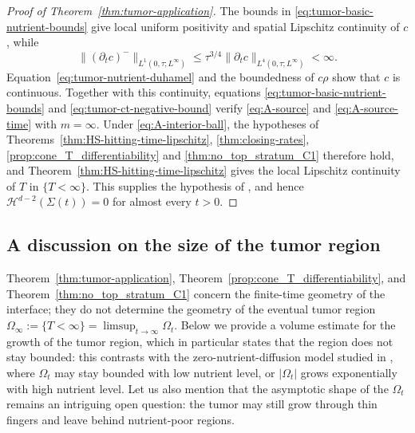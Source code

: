 \documentclass[11pt]{amsart}
\numberwithin{equation}{section}
\numberwithin{figure}{section}
\theoremstyle{plain}
\theoremstyle{definition}
\theoremstyle{remark}
\theoremstyle{plain}
\begin{document}
\begin{proof}[Proof of Theorem~\ref{thm:tumor-application}]
The bounds in \eqref{eq:tumor-basic-nutrient-bounds} give local uniform
positivity and spatial Lipschitz continuity of $c$, while
\begin{equation}\label{eq:tumor-ct-negative-bound}
 \|(\partial_t c)^-\|_{L^1(0,\tau;L^\infty)}
 \leq \tau^{3/4}\|\partial_t c\|_{L^4(0,\tau;L^\infty)}<\infty.
\end{equation}
Equation~\eqref{eq:tumor-nutrient-duhamel} and the boundedness of $c\rho$
show that $c$ is continuous.  Together with this continuity, equations
\eqref{eq:tumor-basic-nutrient-bounds} and
\eqref{eq:tumor-ct-negative-bound} verify \eqref{eq:A-source} and
\eqref{eq:A-source-time} with $m=\infty$. Under \eqref{eq:A-interior-ball}, the hypotheses
of Theorems~\ref{thm:HS-hitting-time-lipschitz}, \ref{thm:closing-rates},
\ref{prop:cone_T_differentiability} and \ref{thm:no_top_stratum_C1} therefore hold, and
Theorem~\ref{thm:HS-hitting-time-lipschitz} gives the local Lipschitz continuity of $T$ in
$\{T<\infty\}$. This supplies the hypothesis of \cite[Prop.~5.17]{CJK25}, and hence
$\mathcal H^{d-2}(\Sigma(t))=0$ for almost every $t>0$.
\end{proof}

\subsection{A discussion on the size of the tumor region}
\label{subsec:tumor-region-size}
Theorem~\ref{thm:tumor-application},
Theorem~\ref{prop:cone_T_differentiability}, and
Theorem~\ref{thm:no_top_stratum_C1} concern the finite-time geometry of the
interface; they do not determine the geometry of the eventual tumor region
$\Omega_\infty:=\{T<\infty\}= \limsup_{t\to\infty} \Omega_t$. Below we provide a volume estimate for the growth of the tumor region, which in particular states that the region does not stay bounded: this 
contrasts with the zero-nutrient-diffusion model studied in \cite{JKT23}, where $\Omega_t$ may stay bounded with low nutrient level, or $|\Omega_t|$ grows exponentially with high nutrient level. Let us also mention that the asymptotic shape of the $\Omega_t$ remains an intriguing open question:
the tumor may still grow through thin fingers and leave behind nutrient-poor
regions.
\end{document}
